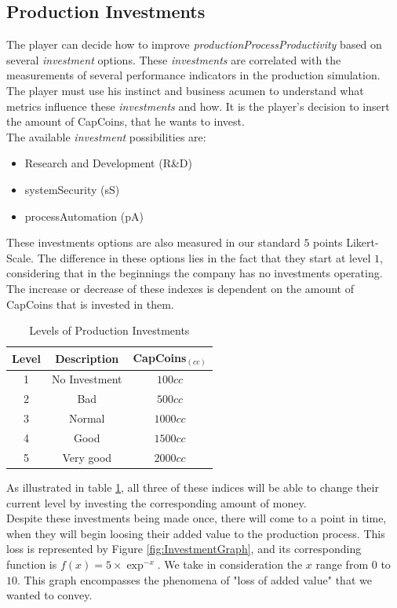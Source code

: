 \subsection{Production Investments}
The player can decide how to improve \textit{productionProcessProductivity} based on several \textit{investment} options. These \textit{investments} are correlated with the measurements of several performance indicators in the production simulation. The player must use his instinct and business acumen to understand what metrics influence these \textit{investments} and how. It is the player's decision to insert the amount of CapCoins, that he wants to invest. \\
The available \textit{investment} possibilities are:
\begin{itemize}
\item Research and Development (R\&D)
\item systemSecurity (sS)
\item processAutomation (pA)
\end{itemize}
These investments options are also measured in our standard $5$ points Likert-Scale. The difference in these options lies in the fact that they start at level $1$, considering that in the beginnings the company has no investments operating. The increase or decrease of these indexes is dependent on the amount of CapCoins that is invested in them.
\begin{table}[ht]
\centering
\begin{tabular}{c|c|c}
\hline
 Level & Description & CapCoins$_{(cc)}$\\
\hline \hline
 1 & No Investment & $100cc$ \\
 2 & Bad & $ 500cc$\\
 3 & Normal & $1000cc$ \\
 4 & Good & $1500cc$ \\
 5 & Very good & $2000cc$\\
\hline
\end{tabular}
\caption{Levels of Production Investments}
\label{table:prod-investments}
\end{table}
As illustrated in table \ref{table:prod-investments}, all three of these indices will be able to change their current level by investing the corresponding amount of money.\\
Despite these investments being made once, there will come to a point in time, when they will begin loosing their added value to the production process. This loss is represented by Figure \ref{fig:InvestmentGraph}, and its corresponding function is $f(x)=5\times\exp^{-x}$. We take in consideration the $x$ range from $0$ to $10$. This graph encompasses the phenomena of "loss of added value" that we wanted to convey.


